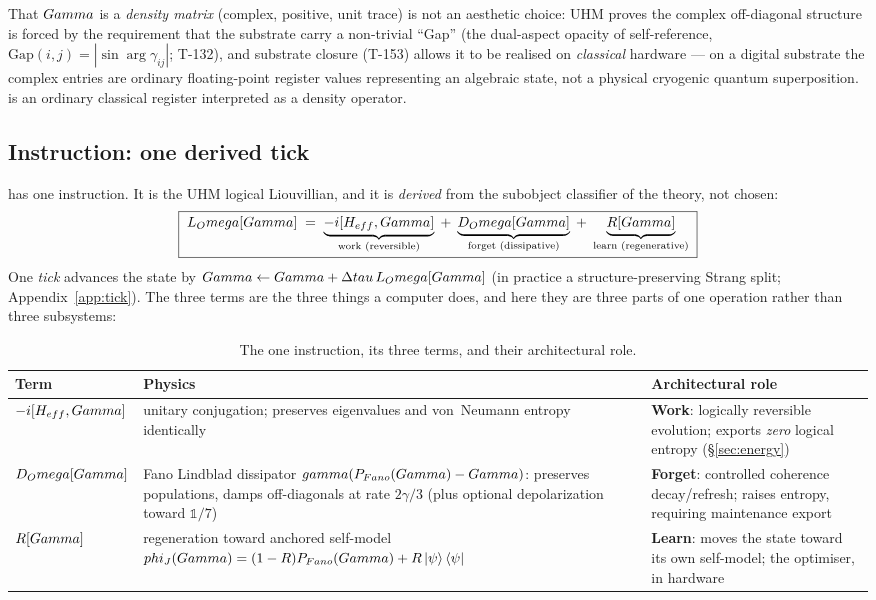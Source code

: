 That $Gamma$ is a \emph{density matrix} (complex, positive, unit trace) is not
an aesthetic choice: UHM proves the complex off-diagonal structure is forced
by the requirement that the substrate carry a non-trivial ``Gap'' (the
dual-aspect opacity of self-reference, $\mathrm{Gap}(i,j)=|\sin\arg\gamma_{ij}|$;
T-132), and substrate closure (T-153) allows it to be realised on
\emph{classical} hardware --- on a digital substrate the complex entries are
ordinary floating-point register values representing an algebraic state, not a
physical cryogenic quantum superposition. \DM{} is an ordinary classical
register interpreted as a density operator.

\subsection{Instruction: one derived tick}

\TALOS{} has one instruction. It is the UHM logical Liouvillian, and it is
\emph{derived} from the subobject classifier of the theory, not chosen:
\begin{equation}
\label{eq:lomega}
\boxed{\;L_Omega[Gamma] \;=\; \underbrace{-i[H_{eff},Gamma]}_{\text{work (reversible)}}
\;+\; \underbrace{D_Omega[Gamma]}_{\text{forget (dissipative)}}
\;+\; \underbrace{R[Gamma]}_{\text{learn (regenerative)}}\;}
\end{equation}
One \emph{tick} advances the state by
$Gamma \leftarrow Gamma + \Delta tau\,L_Omega[Gamma]$ (in practice a
structure-preserving Strang split; Appendix~\ref{app:tick}). The three terms
are the three things a computer does, and here they are three parts of one
operation rather than three subsystems:

\begin{table}[H]
\centering\small
\caption{The one instruction, its three terms, and their architectural role.}
\label{tab:three-terms}
\begin{tabular}{@{}p{2.9cm}p{4.0cm}p{5.2cm}@{}}
\toprule
\textbf{Term} & \textbf{Physics} & \textbf{Architectural role} \\
\midrule
$-i[H_{eff},Gamma]$ & unitary conjugation; preserves eigenvalues and von~Neumann entropy identically & \textbf{Work}: logically reversible evolution; exports \emph{zero} logical entropy (\S\ref{sec:energy}) \\
$D_Omega[Gamma]$ & Fano Lindblad dissipator $gamma(P_{Fano}(Gamma)-Gamma)$: preserves populations, damps off-diagonals at rate $2\gamma/3$ (plus optional depolarization toward $\mathbb{1}/7$) & \textbf{Forget}: controlled coherence decay/refresh; raises entropy, requiring maintenance export \\
$R[Gamma]$ & regeneration toward anchored self-model $phi_J(Gamma)=(1-R)P_{Fano}(Gamma)+R\ket{\psi}\bra{\psi}$ & \textbf{Learn}: moves the state toward its own self-model; the optimiser, in hardware \\
\bottomrule
\end{tabular}
\end{table}

